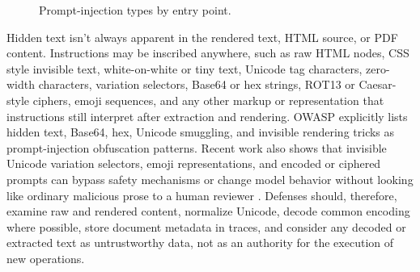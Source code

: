 \documentclass[11pt,a4paper]{report}
\begin{document}
\begin{figure}[H]
\caption{Prompt-injection types by entry point.}
\label{fig:prompt-injection-types}
\end{figure}

Hidden text isn't always apparent in the rendered text, HTML source, or PDF content. Instructions may be inscribed anywhere, such as raw HTML nodes, CSS style invisible text, white-on-white or tiny text, Unicode tag characters, zero-width characters, variation selectors, Base64 or hex strings, ROT13 or Caesar-style ciphers, emoji sequences, and any other markup or representation that instructions still interpret after extraction and rendering. OWASP explicitly lists hidden text, Base64, hex, Unicode smuggling, and invisible rendering tricks as prompt-injection obfuscation patterns. Recent work also shows that invisible Unicode variation selectors, emoji representations, and encoded or ciphered prompts can bypass safety mechanisms or change model behavior without looking like ordinary malicious prose to a human reviewer \cite{owaspPromptInjectionCheatSheet,imperceptibleJailbreak2025,emojiJailbreak2026,weiJailbroken2023}. Defenses should, therefore, examine raw and rendered content, normalize Unicode, decode common encoding where possible, store document metadata in traces, and consider any decoded or extracted text as untrustworthy data, not as an authority for the execution of new operations.
\end{document}
